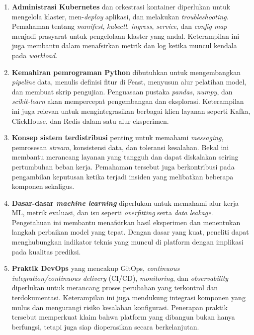 \begin{enumerate}
    \item \textbf{Administrasi Kubernetes} dan orkestrasi kontainer diperlukan untuk mengelola klaster, men-\textit{deploy} aplikasi, dan melakukan \textit{troubleshooting}. Pemahaman tentang \textit{manifest}, \textit{kubectl}, \textit{ingress}, \textit{service}, dan \textit{config map} menjadi prasyarat untuk pengelolaan klaster yang andal. Keterampilan ini juga membantu dalam menafsirkan metrik dan log ketika muncul kendala pada \textit{workload}.
    
    \vspace{0.5em}
    
    \item \textbf{Kemahiran pemrograman Python} dibutuhkan untuk mengembangkan \textit{pipeline} data, menulis definisi fitur di Feast, menyusun alur pelatihan model, dan membuat skrip pengujian. Penguasaan pustaka \textit{pandas}, \textit{numpy}, dan \textit{scikit-learn} akan mempercepat pengembangan dan eksplorasi. Keterampilan ini juga relevan untuk mengintegrasikan berbagai klien layanan seperti Kafka, ClickHouse, dan Redis dalam satu alur eksperimen.
    
    \vspace{0.5em}
    
    \item \textbf{Konsep sistem terdistribusi} penting untuk memahami \textit{messaging}, pemrosesan \textit{stream}, konsistensi data, dan toleransi kesalahan. Bekal ini membantu merancang layanan yang tangguh dan dapat diskalakan seiring pertumbuhan beban kerja. Pemahaman tersebut juga berkontribusi pada pengambilan keputusan ketika terjadi insiden yang melibatkan beberapa komponen sekaligus.
    
    \vspace{0.5em}
    
    \item \textbf{Dasar-dasar \textit{machine learning}} diperlukan untuk memahami alur kerja ML, metrik evaluasi, dan isu seperti \textit{overfitting} serta \textit{data leakage}. Pengetahuan ini membantu menafsirkan hasil eksperimen dan menentukan langkah perbaikan model yang tepat. Dengan dasar yang kuat, peneliti dapat menghubungkan indikator teknis yang muncul di platform dengan implikasi pada kualitas prediksi.
    
    \vspace{0.5em}
    
    \item \textbf{Praktik DevOps} yang mencakup GitOps, \textit{continuous integration/continuous delivery} (CI/CD), \textit{monitoring}, dan \textit{observability} diperlukan untuk merancang proses perubahan yang terkontrol dan terdokumentasi. Keterampilan ini juga mendukung integrasi komponen yang mulus dan mengurangi risiko kesalahan konfigurasi. Penerapan praktik tersebut memperkuat klaim bahwa platform yang dibangun bukan hanya berfungsi, tetapi juga siap dioperasikan secara berkelanjutan.
    

\end{enumerate}
